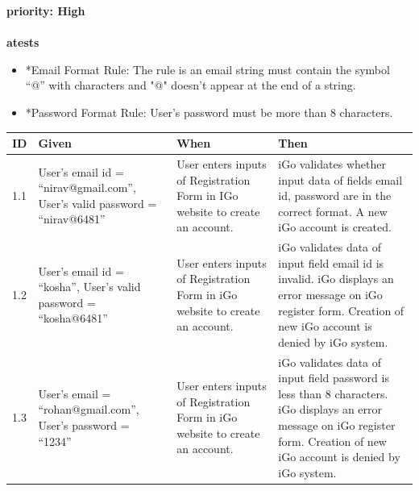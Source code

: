 \documentclass[11pt, english]{report}
\begin{document}
\textbf{\gls{priority}: High}\\ \\
\textbf{\gls{atests}}
\begin{itemize}
    \item *Email Format Rule: The rule is an email string must contain the symbol “@” with characters and "@" doesn't appear at the end of a string.
    \item *Password Format Rule: User’s password must be more than 8 characters.
\end{itemize}

\setlength{\tabcolsep}{18pt}
\renewcommand{\arraystretch}{1.5}
\begin{tabular}{ |p{0.5cm}|p{3cm}|p{3.5cm}|p{5cm}| }
\hline
\textbf{ID} & \textbf{Given} & \textbf{When} & \textbf{Then}\\
\hline
1.1 &
User’s email id = “nirav@gmail.com”, User’s valid password = “nirav@6481” &
User enters inputs of Registration Form in IGo website to create an account. &
iGo validates whether input data of fields email id, password are in the correct format. A new iGo account is created.
 \\
\hline
1.2 &
User’s email id = “kosha”, 
User’s valid password = “kosha@6481” &
User enters inputs of Registration Form in iGo website to create an account. &
iGo validates data of input field email id is invalid. iGo displays an error message on iGo register form. Creation of new iGo account is denied by iGo system.
\\

\hline
1.3 &
User’s email = “rohan@gmail.com”,
User’s password = “1234”
&
User enters inputs of Registration Form in iGo website to create an account. & 
iGo validates data of input field password is less than 8 characters. iGo displays an error message on iGo register form.
Creation of new iGo account is denied by iGo system.
 \\
\hline
\end{tabular}
\end{document}
